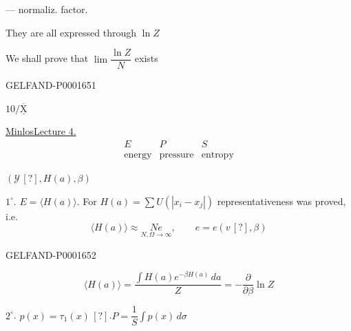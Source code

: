 --- normaliz. factor.


They are all expressed through $\ln Z$

We shall prove that $\lim\dfrac{\ln Z}{N}$ exists



\begin{GelfandAdjacentEvidence}{GELFAND-P000165}{1}
\hfill{}


$10/\overline{\underline{\mathrm{X}}}$\quad {}


\underline{Minlos}\qquad \underline{Lecture 4.}
\begin{equation*}
\begin{array}{ccc}
E&P&S\\
\text{energy}&\text{pressure}&\text{entropy}
\end{array}
\end{equation*}


$(\mathcal{Y}\, [?], H (a),\beta)$
\end{GelfandAdjacentEvidence}


$1^\circ$. $E=\langle H (a)\rangle$. For $H (a)=\sum U (|x_i-x_j|)$ representativeness was proved, i.e.
\begin{equation*}
\langle H (a)\rangle\approx\underset{N,\Omega\longrightarrow\infty}{Ne},\qquad e=e (v\, [?],\beta)
\end{equation*}

\begin{GelfandAdjacentEvidence}{GELFAND-P000165}{2}
\end{GelfandAdjacentEvidence}

\begin{equation*}
\langle H (a)\rangle=\frac{\int H (a)e^{-\beta H (a)}\, da}{Z}=-\frac{\partial}{\partial\beta}\ln Z
\end{equation*}


$2^\circ$. $p (x)=\tau_1(x)\, [?]$.\quad $P=\dfrac{1}{S}\int p (x)\, d\sigma$

